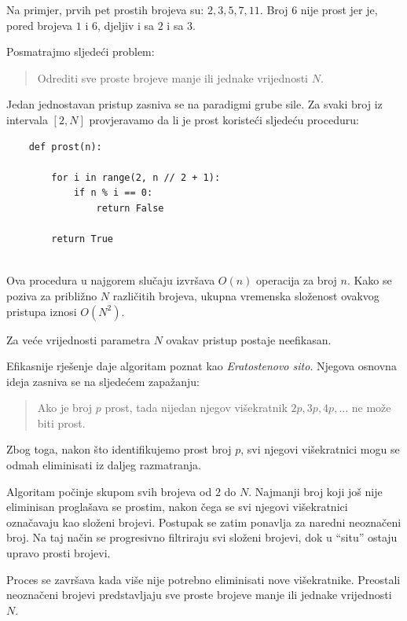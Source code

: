 Na primjer, prvih pet prostih brojeva su: $2, 3, 5, 7, 11.$ Broj $6$ nije prost jer je, pored brojeva $1$ i $6$, djeljiv i sa $2$ i sa $3$.

\medskip

Posmatrajmo sljedeći problem:
\begin{quote}
	Odrediti sve proste brojeve manje ili jednake vrijednosti $N$.
\end{quote}

Jedan jednostavan pristup zasniva se na paradigmi grube sile. Za svaki broj iz intervala $[2,N]$ provjeravamo da li je prost koristeći sljedeću proceduru:

\begin{verbatim}
	def prost(n):
	
	    for i in range(2, n // 2 + 1):
	        if n % i == 0:
	            return False
	
	    return True
	
\end{verbatim}

Ova procedura u najgorem slučaju izvršava $O(n)$ operacija za broj $n$. Kako se poziva za približno $N$ različitih brojeva, ukupna vremenska složenost ovakvog pristupa iznosi $
O(N^2).$

Za veće vrijednosti parametra $N$ ovakav pristup postaje neefikasan.

\medskip

Efikasnije rješenje daje algoritam poznat kao \textit{Eratostenovo sito}. Njegova osnovna ideja zasniva se na sljedećem zapažanju:

\begin{quote}
	Ako je broj $p$ prost, tada nijedan njegov višekratnik
	$ 2p,3p,4p,\ldots$	ne može biti prost.
\end{quote}

Zbog toga, nakon što identifikujemo prost broj $p$, svi njegovi višekratnici mogu se odmah eliminisati iz daljeg razmatranja.

Algoritam počinje skupom svih brojeva od $2$ do $N$. Najmanji broj koji još nije eliminisan proglašava se prostim, nakon čega se svi njegovi višekratnici označavaju kao složeni brojevi. Postupak se zatim ponavlja za naredni neoznačeni broj. Na taj način se progresivno filtriraju svi složeni brojevi, dok u ``situ'' ostaju upravo prosti brojevi.

Proces se završava kada više nije potrebno eliminisati nove višekratnike. Preostali neoznačeni brojevi predstavljaju sve proste brojeve manje ili jednake vrijednosti $N$.

